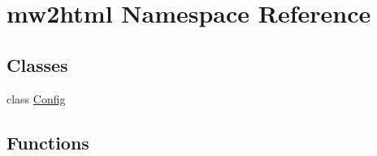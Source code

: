 \hypertarget{namespacemw2html}{}\section{mw2html Namespace Reference}
\label{namespacemw2html}
\subsection*{Classes}
\begin{DoxyCompactItemize}
\item 
class \hyperlink{classmw2html_1_1_config}{Config}
\end{DoxyCompactItemize}
\subsection*{Functions}
